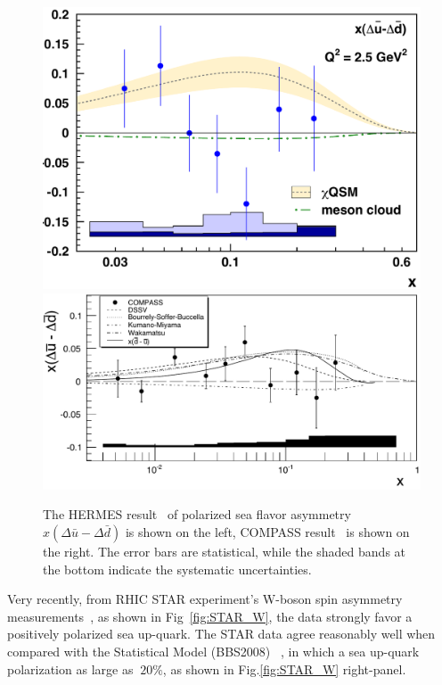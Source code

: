 \begin{figure} [htbp]
  \centering
    \includegraphics[width=0.41\linewidth]{figs_xj/hermes_dubar_ddbar2005.pdf}
    \includegraphics[width=0.58\linewidth]{figs_xj/compass_dbar_ubar2010.pdf} \\
  \caption{\label{fig:polubardbar} 
  The HERMES result~\cite{Airapetian:2004zf} of 
 polarized sea flavor asymmetry
$x(\Delta \bar{u} - \Delta \bar{d})$ is shown on the left, COMPASS result~\cite{Alekseev:2010ub} is shown on the right.
The error bars are statistical, while the shaded bands at the bottom indicate the systematic
uncertainties.}
\end{figure}

Very recently, from RHIC STAR experiment's W-boson spin asymmetry measurements~\cite{Adamczyk:2014xyw}, as shown in Fig~\ref{fig:STAR_W}, the data strongly favor a positively polarized sea up-quark.  
The STAR data agree reasonably well when compared with the Statistical Model (BBS2008) ~\cite{Bourrely200739}, in which a sea up-quark polarization as large as $~20\%$, as shown in Fig.\ref{fig:STAR_W} right-panel.

